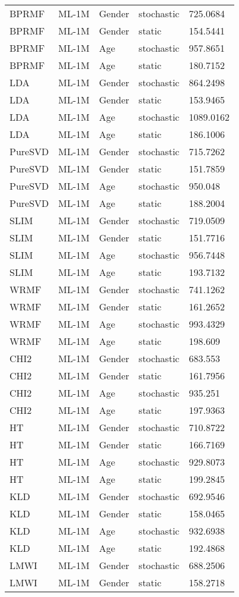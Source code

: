 \begin{center}
\begin{longtable}{|l|l|l|l|l|}
BPRMF & ML-1M  & Gender & stochastic & 725.0684\\
BPRMF & ML-1M& Gender& static& 154.5441\\
BPRMF& ML-1M&Age&stochastic& 957.8651\\
BPRMF& ML-1M& Age& static& 180.7152\\
LDA& ML-1M& Gender& stochastic& 864.2498\\
LDA& ML-1M& Gender& static& 153.9465\\
LDA& ML-1M& Age& stochastic& 1089.0162\\
LDA& ML-1M& Age& static& 186.1006\\
PureSVD& ML-1M& Gender& stochastic& 715.7262\\
PureSVD& ML-1M& Gender& static& 151.7859\\
PureSVD& ML-1M& Age& stochastic& 950.048\\
PureSVD& ML-1M& Age& static& 188.2004\\
SLIM& ML-1M& Gender& stochastic& 719.0509\\
SLIM&ML-1M&Gender&static&151.7716\\
SLIM&ML-1M&Age&stochastic&956.7448\\
SLIM&ML-1M&Age&static&193.7132\\
WRMF&ML-1M&Gender&stochastic&741.1262\\
WRMF&ML-1M&Gender&static&161.2652\\
WRMF&ML-1M&Age&stochastic&993.4329\\
WRMF&ML-1M&Age&static&198.609\\
CHI2&ML-1M&Gender&stochastic&683.553\\
CHI2&ML-1M&Gender&static&161.7956\\
CHI2&ML-1M&Age&stochastic&935.251\\
CHI2&ML-1M&Age&static&197.9363\\
HT&ML-1M&Gender&stochastic&710.8722\\
HT&ML-1M&Gender&static&166.7169\\
HT&ML-1M&Age&stochastic&929.8073\\
HT&ML-1M&Age&static&199.2845\\
KLD&ML-1M&Gender&stochastic&692.9546\\
KLD&ML-1M&Gender&static&158.0465\\
KLD&ML-1M&Age&stochastic&932.6938\\
KLD&ML-1M&Age&static&192.4868\\
LMWI&ML-1M&Gender&stochastic&688.2506\\
LMWI&ML-1M&Gender&static&158.2718\\

\end{longtable}
\end{center}
